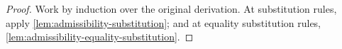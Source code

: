 \begin{proof}
  Work by induction over the original derivation.
  At substitution rules, apply \cref{lem:admissibility-substitution}; and at equality substitution rules, \cref{lem:admissibility-equality-substitution}.
\end{proof}




